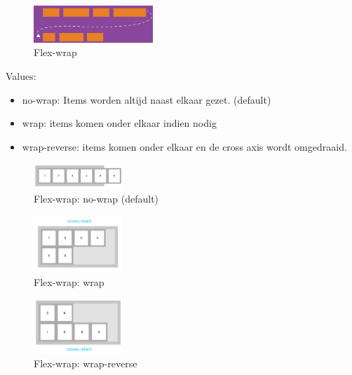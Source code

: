 \documentclass{article}
\begin{document}
\begin{figure}[H]
    \centering
    \includegraphics[width=0.4\textwidth]{img/Screenshot_20200427_092927.png}
    \caption{Flex-wrap}
\end{figure}

Values:

\begin{itemize}
    \item no-wrap: Items worden altijd naast elkaar gezet. (default)
    \item wrap: items komen onder elkaar indien nodig
    \item wrap-reverse: items komen onder elkaar en de cross axis wordt omgedraaid.
\end{itemize}

\begin{figure}[H]
    \centering
    \includegraphics[width=0.3\textwidth]{img/Screenshot_20200427_093040.png}
    \caption{Flex-wrap: no-wrap (default)}
\end{figure}

\begin{figure}[H]
    \centering
    \includegraphics[width=0.3\textwidth]{img/Screenshot_20200427_093104.png}
    \caption{Flex-wrap: wrap}
\end{figure}

\begin{figure}[H]
    \centering
    \includegraphics[width=0.3\textwidth]{img/Screenshot_20200427_093216.png}
    \caption{Flex-wrap: wrap-reverse}
\end{figure}
\end{document}
